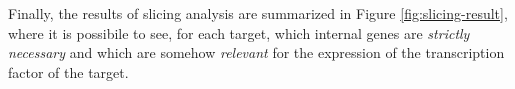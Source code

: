 Finally, the results of slicing analysis are summarized in Figure \ref{fig:slicing-result}, where it is possibile to see, for each target, which internal genes are \emph{strictly necessary} and which are somehow \emph{relevant} for the expression of the transcription factor of the target. 
%
%
%
%
